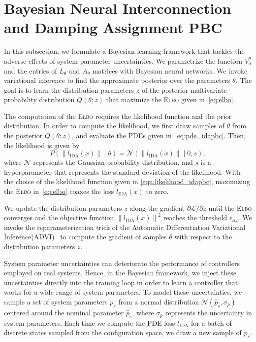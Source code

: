 
\section{Bayesian Neural Interconnection and Damping Assignment PBC}

In this subsection, we formulate a Bayesian learning framework that tackles the
adverse effects of system parameter uncertainties. 
%
We parametrize the function $V_d^\theta$ and the entries of $L_\theta$ and
$A_\theta$ matrices with Bayesian neural networks. 
%
We invoke variational inference to find the approximate posterior over the
parameters $\theta$. The goal is to learn the distribution parameters $z$ of the
posterior multivariate probability distribution $Q(\theta;z)$ that maximize the
\textsc{Elbo} given in~\eqref{eq:elbo}.
%


The computation of the \textsc{Elbo} requires the likelihood function and the
prior distribution.
%
In order to compute the likelihood, we first draw samples of $\theta$ from the
posterior $Q(\theta;z)$, and evaluate the PDEs given in~\eqref{eq:pde_idapbc}.
Then, the likelihood is given by
\begin{equation}
    P( \left\| l_{\textrm{IDA}} (x) \right\| \mid \theta) = \mathcal{N}\left(\left\| l_{\textrm{IDA}} (x) \right\| \; | \; 0, s \right),
    \label{eqn:likelihood_idapbc}
\end{equation}
where $\mathcal{N}$ represents the Gaussian probability distribution, and $s$ is
a hyperparameter that represents the standard deviation of the likelihood.
%
With the choice of the likelihood function given in
\eqref{eqn:likelihood_idapbc}, maximizing the \textsc{Elbo}
in~\eqref{eq:elbo} coaxes the loss $l_{\text{IDA}}(x)$ to zero.


%
We update the distribution parameters $z$ along the gradient $\partial
\mathcal{L}/\partial z$ until the \textsc{Elbo} converges and the objective
function $\left\| l_{\textrm{IDA}} (x) \right\|^2$ reaches the threshold
$\epsilon_{tol}$.
%
We invoke the reparameterization trick of the Automatic Differentiation
Variational Inference(\textsc{ADVI})~\cite{kucukelbir2015automatic} to compute
the gradient of samples $\theta$ with respect to the distribution parameters
$z$.


System parameter uncertainties can deteriorate the performance of controllers
employed on real systems. 
%
Hence, in the Bayesian framework, we inject these uncertainties directly into
the training loop in order to learn a controller that works for a wide range of
system parameters.
%
To model these uncertainties, we sample a set of system parameters $p_s$ from
a normal distribution $\mathcal{N}(\hat{p}_s, \sigma_{p})$ centered around the
nominal parameter $\hat{p}_s$, where $\sigma_{p}$ represents the uncertainty
in system parameters.
%
Each time we compute the PDE loss $l_{\text{IDA}}$ for a batch of discrete
states sampled from the configuration space, we draw a new sample
of $p_s$.
